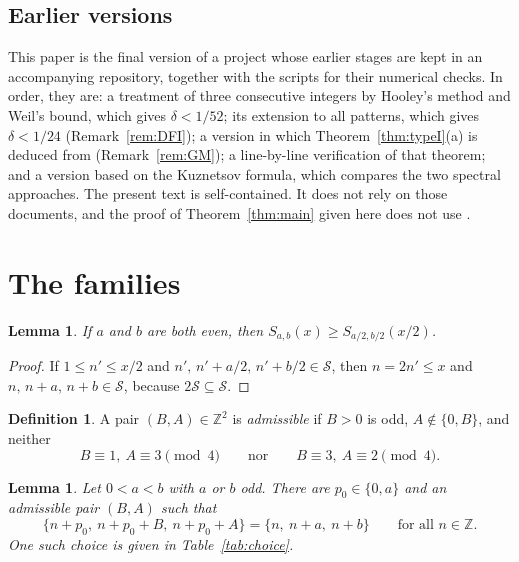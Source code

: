 \documentclass[11pt]{amsart}
\newtheorem{lemma}[theorem]{Lemma}
\theoremstyle{remark}
\theoremstyle{definition}
\newtheorem{definition}[theorem]{Definition}
\numberwithin{equation}{section}
\newcommand{\Sc}{\mathcal{S}}
\newcommand{\Z}{\mathbb{Z}}
\begin{document}
\subsection{Earlier versions}\label{sec:history}
This paper is the final version of a project whose earlier stages are kept in an accompanying repository, together with the scripts for their numerical checks. In order, they are: a treatment of three consecutive integers by Hooley's method and Weil's bound, which gives $\delta<1/52$; its extension to all patterns, which gives $\delta<1/24$ (Remark~\ref{rem:DFI}); a version in which Theorem~\ref{thm:typeI}(a) is deduced from \cite[Theorem~8.1]{GM1} (Remark~\ref{rem:GM}); a line-by-line verification of that theorem; and a version based on the Kuznetsov formula, which compares the two spectral approaches. The present text is self-contained. It does not rely on those documents, and the proof of Theorem~\ref{thm:main} given here does not use \cite{GM1,GM2}.

\section{The families}\label{sec:families}

\begin{lemma}\label{lem:reduce}
If $a$ and $b$ are both even, then $S_{a,b}(x)\ge S_{a/2,b/2}(x/2)$.
\end{lemma}

\begin{proof}
If $1\le n'\le x/2$ and $n',\,n'+a/2,\,n'+b/2\in\Sc$, then $n=2n'\le x$ and $n,\,n+a,\,n+b\in\Sc$, because $2\Sc\subseteq\Sc$.
\end{proof}

\begin{definition}
A pair $(B,A)\in\Z^2$ is \emph{admissible} if $B>0$ is odd, $A\notin\{0,B\}$, and neither
\[
B\equiv1,\ A\equiv3\pmod 4\qquad\text{nor}\qquad B\equiv3,\ A\equiv2\pmod4.
\]
\end{definition}

\begin{lemma}\label{lem:choice}
Let $0<a<b$ with $a$ or $b$ odd. There are $p_0\in\{0,a\}$ and an admissible pair $(B,A)$ such that
\[
\{n+p_0,\ n+p_0+B,\ n+p_0+A\}=\{n,\ n+a,\ n+b\}\qquad\text{for all }n\in\Z.
\]
One such choice is given in Table~\ref{tab:choice}.
\end{lemma}
\end{document}
